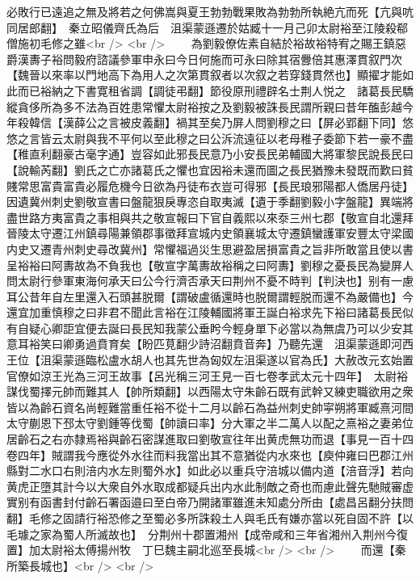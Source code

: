 必敗行已遠追之無及將若之何佛嵩與夏王勃勃戰果敗為勃勃所執絶亢而死【亢與吭同居郎翻】　秦立昭儀齊氏為后　沮渠蒙遜遷於姑臧十一月己卯太尉裕至江陵殺郗僧施初毛修之雖<br />
<br />
　　為劉毅僚佐素自結於裕故裕特宥之賜王鎮惡爵漢夀子裕問毅府諮議參軍申永曰今日何施而可永曰除其宿釁倍其惠澤貫叙門次【魏晉以來率以門地高下為用人之次第貫叙者以次叙之若穿錢貫然也】顯擢才能如此而已裕納之下書寛租省調【調徒弔翻】節役原刑禮辟名士荆人悦之　諸葛長民驕縱貪侈所為多不法為百姓患常懼太尉裕按之及劉毅被誅長民謂所親曰昔年醢彭越今年殺韓信【漢薛公之言被皮義翻】禍其至矣乃屏人問劉穆之曰【屏必郢翻下同】悠悠之言皆云太尉與我不平何以至此穆之曰公泝流遠征以老母稚子委節下若一豪不盡【稚直利翻豪古毫字通】豈容如此邪長民意乃小安長民弟輔國大將軍黎民說長民曰【說輸芮翻】劉氏之亡亦諸葛氏之懼也宜因裕未還而圖之長民猶豫未發既而歎曰貧賤常思富貴富貴必履危機今日欲為丹徒布衣豈可得邪【長民琅邪陽都人僑居丹徒】因遺冀州刺史劉敬宣書曰盤龍狠戾專恣自取夷滅【遺于季翻劉毅小字盤龍】異端將盡世路方夷富貴之事相與共之敬宣報曰下官自義熙以來沗三州七郡【敬宣自北還拜晉陵太守遷江州鎮尋陽兼領郡事徵拜宣城内史領襄城太守遷鎮蠻護軍安豐太守梁國内史又遷青州刺史尋改冀州】常懼福過災生思避盈居損富貴之旨非所敢當且使以書呈裕裕曰阿夀故為不負我也【敬宣字萬夀故裕稱之曰阿夀】劉穆之憂長民為變屏人問太尉行參軍東海何承天曰公今行濟否承天曰荆州不憂不時判【判決也】别有一慮耳公昔年自左里還入石頭甚脱爾【謂破盧循還時也脱爾謂輕脱而還不為嚴備也】今還宜加重慎穆之曰非君不聞此言裕在江陵輔國將軍王誕白裕求先下裕曰諸葛長民似有自疑心卿詎宜便去誕曰長民知我蒙公垂盻今輕身單下必當以為無虞乃可以少安其意耳裕笑曰卿勇過賁育矣【盼匹莧翻少詩沼翻賁音奔】乃聽先還　沮渠蒙遜即河西王位【沮渠蒙遜臨松盧水胡人也其先世為匈奴左沮渠遂以官為氏】大赦改元玄始置官僚如涼王光為三河王故事【呂光稱三河王見一百七卷孝武太元十四年】　太尉裕謀伐蜀擇元帥而難其人【帥所類翻】以西陽太守朱齡石既有武幹又練吏職欲用之衆皆以為齡石資名尚輕難當重任裕不從十二月以齡石為益州刺史帥寜朔將軍臧熹河間太守蒯恩下邳太守劉鍾等伐蜀【帥讀曰率】分大軍之半二萬人以配之熹裕之妻弟位居齡石之右亦隸焉裕與齡石密謀進取曰劉敬宣往年出黄虎無功而退【事見一百十四卷四年】賊謂我今應從外水往而料我當出其不意猶從内水來也【庾仲雍曰巴郡江州縣對二水口右則涪内水左則蜀外水】如此必以重兵守涪城以備内道【涪音浮】若向黄虎正墮其計今以大衆自外水取成都疑兵出内水此制敵之奇也而慮此聲先馳賊審虚實别有函書封付齡石署函邉曰至白帝乃開諸軍雖進未知處分所由【處昌呂翻分扶問翻】毛修之固請行裕恐修之至蜀必多所誅殺土人與毛氏有嫌亦當以死自固不許【以毛璩之家為蜀人所滅故也】　分荆州十郡置湘州【成帝咸和三年省湘州入荆州今復置】加太尉裕太傅揚州牧　丁巳魏主嗣北巡至長城<br />
<br />
　　而還【秦所築長城也】<br />
<br />
